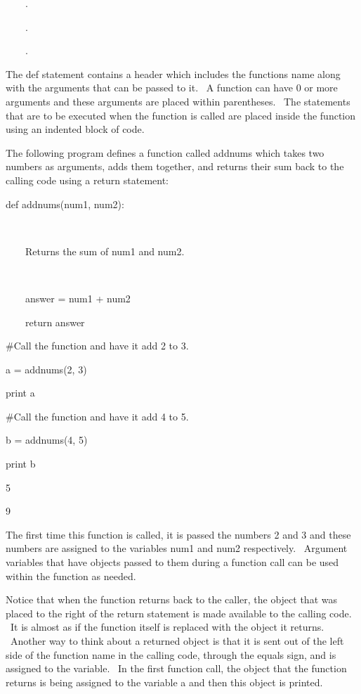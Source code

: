 \documentclass[12pt,twoside]{book}
\begin{document}
\ \ \ \ .

\ \ \ \ .

\ \ \ \ .


\bigskip

The def statement contains a header which includes the
function{\textquotesingle}s name along with the arguments that can be
passed to it. \ A function can have 0 or more arguments and these
arguments are placed within parentheses. \ The statements that are to
be executed when the function is called are placed inside the function
using an indented block of code. \ 


\bigskip

The following program defines a function called addnums which takes two
numbers as arguments, adds them together, and returns their sum back to
the calling code using a return statement:


\bigskip

def addnums(num1, num2):

\ \ \ \ {\textquotedbl}{\textquotedbl}{\textquotedbl}

\ \ \ \ Returns the sum of num1 and num2.

\ \ \ \ {\textquotedbl}{\textquotedbl}{\textquotedbl}

\ \ \ \ answer = num1 + num2

\ \ \ \ return answer


\bigskip

\#Call the function and have it add 2 to 3.

a = addnums(2, 3)

print a



\#Call the function and have it add 4 to 5.

b = addnums(4, 5)

print b

{\textbar}

5

9

The first time this function is called, it is passed the numbers 2 and 3
and these numbers are assigned to the variables num1 and num2
respectively. \ Argument variables that have objects passed to them
during a function call can be used within the function as needed.


\bigskip

Notice that when the function returns back to the caller, the object
that was placed to the right of the return statement is made available
to the calling code. \ It is almost as if the function itself is
replaced with the object it returns. \ Another way to think about a
returned object is that it is sent out of the left side of the function
name in the calling code, through the equals sign, and is assigned to
the variable. \ In the first function call, the object that the
function returns is being assigned to the variable
{\textquotesingle}a{\textquotesingle} and then this object is printed.
\end{document}
